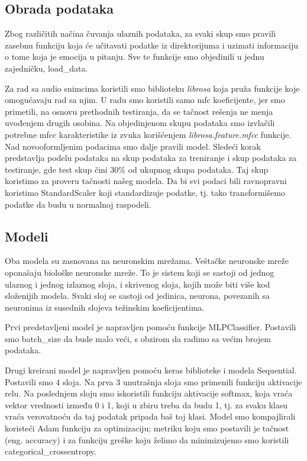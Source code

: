 \documentclass{article}
\begin{document}
\subsection{Obrada podataka}
Zbog različitih načina čuvanja ulaznih podataka, za svaki skup smo pravili zasebnu funkciju koja će učitavati podatke iz direktorijuma i uzimati informaciju o tome koja je emocija u pitanju. Sve te funkcije smo objedinili u jednu zajedničku, load\_data. 

Za rad sa audio snimcima koristili smo biblioteku \textit{librosa} koja pruža funkcije koje omogućavaju rad sa njim. U radu smo koristili samo mfc koeficijente, jer smo primetili, na osnovu prethodnih testiranja, da se tačnost rešenja ne menja uvođenjem drugih osobina. Na objedinjenom skupu podataka smo izvlačili potrebne mfcc karakteristike iz zvuka korišćenjem \textit{librosa.feature.mfcc} funkcije. Nad novooformljenim podacima smo dalje pravili model.
Sledeći korak predstavlja podelu podataka na skup podataka za treniranje i skup podataka za testiranje, gde test skup čini 30\% od ukupnog skupa podataka. Taj skup koristimo za proveru tačnosti našeg modela. Da bi svi podaci bili ravnopravni koristimo StandardScaler koji standardizuje podatke, tj. tako transformišemo podatke da budu u normalnoj raspodeli.


\subsection{Modeli}
Oba modela su zasnovana na neuronskim mrežama. Veštačke neuronske mreže oponašaju biološke neuronske mreže. To je sistem koji se sastoji od jednog ulaznog i jednog izlaznog sloja, i skrivenog sloja, kojih može biti više kod složenijih modela. Svaki sloj se sastoji od jedinica, neurona, povezanih sa neuronima iz susednih slojeva težinskim koeficijentima.

Prvi predstavljeni model je napravljen pomoću funkcije MLPClassifier. Postavili smo batch\_size da bude malo veći, s obzirom da radimo sa većim brojem podataka.


Drugi kreirani model je napravljen pomoću keras biblioteke i modela Sequential. Postavili smo 4 sloja. Na prva 3 unutrašnja sloja smo primenili funkciju aktivacije relu. Na poslednjem sloju smo iskoristili funkciju aktivacije softmax, koja vraća vektor vrednosti između 0 i 1, koji u zbiru treba da budu 1, tj. za svaku klasu vraća verovatnoću da taj podatak pripada baš toj klasi. Model smo kompajlirali koristeći Adam funkciju za optimizaciju; metriku koju smo postavili je tačnost (eng. accuracy) i za funkciju greške koju želimo da minimizujemo smo koristili categorical\_crossentropy.
\end{document}
